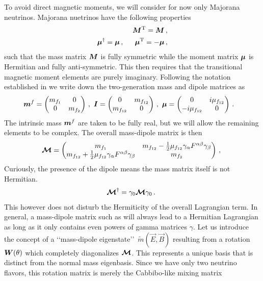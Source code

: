 To avoid direct magnetic moments, we will consider for now only Majorana neutrinos. Majorana nuetrinos have the following properties
\begin{alignat}{1}
	\label{mix:eq:00a}	\bb{M}^{\mathrm{T}}=\bb{M}\,,\\
	\label{mix:eq:00b}	\bb{\mu}^{\dagger}=\bb{\mu}\,,\indent\bb{\mu}^{\mathrm{T}}=-\bb{\mu}\,,
\end{alignat}
such that the mass matrix $\boldsymbol{M}$ is fully symmetric while the moment matrix $\boldsymbol{\mu}$ is Hermitian and fully anti-symmetric. This then requires that the transitional magnetic moment elements are purely imaginary. Following the notation established in  we write down the two-generation mass and dipole matrices as
\begin{alignat}{1}
	\label{mix:eq:01a} \bb{m}^{f} &= 
	\begin{pmatrix}
		m_{f_{1}} & 0\\
		0 & m_{f_{2}}
	\end{pmatrix}\,,\ 
	\bb{I} = 
	\begin{pmatrix}
		0 & m_{f_{12}}\\
		m_{f_{12}} & 0
	\end{pmatrix}\,,\ 
	\bb{\mu} = 
	\begin{pmatrix}
		0 & i\mu_{f_{12}}\\
		-i\mu_{f_{12}} & 0
	\end{pmatrix}\,.
\end{alignat}
The intrinsic mass $\boldsymbol{m}^{f}$ are taken to be fully real, but we will allow the remaining elements to be complex. The overall mass-dipole matrix is then
\begin{alignat}{1}
	\label{mix:eq:02} \bb{\mathcal{M}} = 
	\begin{pmatrix}
		m_{f_{1}} & m_{f_{12}}-\frac{1}{2}\mu_{f_{12}}\gamma_{\alpha}F^{\alpha\beta}\gamma_{\beta}\\
		m_{f_{12}}+\frac{1}{2}\mu_{f_{12}}\gamma_{\alpha}F^{\alpha\beta}\gamma_{\beta} & m_{f_{2}}
	\end{pmatrix}\,,\ 
\end{alignat}
Curiously, the presence of the dipole means the mass matrix itself is not Hermitian.
\begin{alignat}{1}
	\label{mix:eq:03} \bb{\mathcal{M}}^{\dagger} = \gamma_{0}\bb{\mathcal{M}}\gamma_{0}\,.\ 
\end{alignat}
This however does not disturb the Hermiticity of the overall Lagrangian term. In general, a mass-dipole matrix such as  will always lead to a Hermitian Lagrangian as long as it only contains even powers of gamma matrices $\gamma$. Let us introduce the concept of a \lq\lq mass-dipole eigenstate\rq\rq\ $\widetilde{m}(\vec{E},\vec{B})$ resulting from a rotation $\boldsymbol{W}(\theta)$ which completely diagonalizes $\boldsymbol{\mathcal{M}}$. This represents a unique basis that is distinct from the normal mass eigenbasis. Since we have only two neutrino flavors, this rotation matrix is merely the Cabbibo-like mixing matrix
